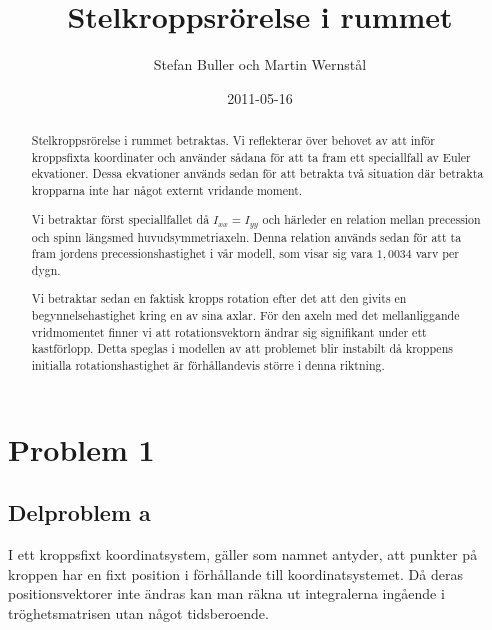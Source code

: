 \documentclass[12pt,a4paper]{article}
\begin{document}

\title{Stelkroppsrörelse i rummet}
	\author{Stefan Buller och Martin Wernstål}
	\date{2011-05-16}
	\maketitle{}
	\thispagestyle{empty}

	\begin{abstract}
	  Stelkroppsrörelse i rummet betraktas. Vi reflekterar över behovet av att inför kroppsfixta 
          koordinater och använder sådana för att ta fram ett speciallfall av Euler ekvationer. Dessa 
          ekvationer används sedan för att betrakta två situation där betrakta kropparna inte har något 
          externt vridande moment. 

          Vi betraktar först speciallfallet då $I_{xx}=I_{yy}$ och härleder en 
          relation mellan precession och spinn längsmed huvudsymmetriaxeln. Denna relation används sedan 
          för att ta fram jordens precessionshastighet i vår modell, som visar sig vara $1,0034$ varv per dygn. 

          Vi betraktar sedan en faktisk kropps rotation efter det att den givits en begynnelsehastighet kring en av sina axlar.
          För den axeln med det mellanliggande vridmomentet finner vi att rotationsvektorn ändrar sig signifikant under ett 
          kastförlopp. Detta speglas i modellen av att problemet blir instabilt då kroppens initialla rotationshastighet 
          är förhållandevis större i denna riktning.
	\end{abstract}

\newpage{}

	\tableofcontents{}
	\thispagestyle{empty}

\newpage{}

	\setcounter{page}{1}
	\pagestyle{plain}
	
	
\section{Problem 1}
	\subsection{Delproblem a}
	I ett kroppsfixt koordinatsystem, gäller som namnet antyder, att punkter på kroppen
	har en fixt position i förhållande till koordinatsystemet. Då deras positionsvektorer
	inte ändras kan man räkna ut integralerna ingående i tröghetsmatrisen utan något tidsberoende.
\end{document}
